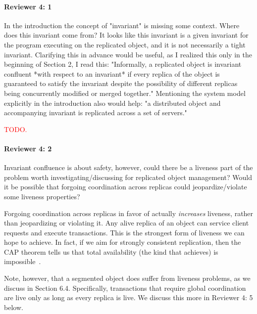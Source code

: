\documentclass[9pt]{article}
\begin{document}
\begin{multicols*}{2}
\paragraph{Reviewer 4: 1}
\begin{feedback}
  In the introduction the concept of "invariant" is missing some context. Where
  does this invariant come from? It looks like this invariant is a given
  invariant for the program executing on the replicated object, and it is not
  necessarily a tight invariant.  Clarifying this in advance would be useful,
  as I realized this only in the beginning of Section 2, I read this:
  "Informally, a replicated object is invariant confluent *with respect to an
  invariant* if every replica of the object is guaranteed to satisfy the
  invariant despite the possibility of different replicas being concurrently
  modified or merged together." Mentioning the system model explicitly in the
  introduction also would help: "a distributed object and accompanying
  invariant is replicated across a set of servers."
\end{feedback}
\textcolor{red}{TODO.}

\paragraph{Reviewer 4: 2}
\begin{feedback}
  Invariant confluence is about safety, however, could there be a liveness part
  of the problem worth investigating/discussing for replicated object
  management? Would it be possible that forgoing coordination across replicas
  could jeopardize/violate some liveness properties?
\end{feedback}
Forgoing coordination across replicas in favor of \invariantconfluence{}
actually \emph{increases} liveness, rather than jeopardizing or violating it.
Any alive replica of an \invariantconfluent{} object can service client
requests and execute transactions. This is the strongest form of liveness we
can hope to achieve. In fact, if we aim for strongly consistent replication,
then the CAP theorem tells us that total availability (the kind that
\invariantconfluence{} achieves) is impossible~\cite{brewer2012cap,
gilbert2002brewer}.

Note, however, that a segmented \invariantconfluent{} object does suffer from
liveness problems, as we discuss in Section 6.4. Specifically, transactions
that require global coordination are live only as long as every replica is
live. We discuss this more in Reviewer 4: 5 below.


\end{multicols*}
\end{document}
